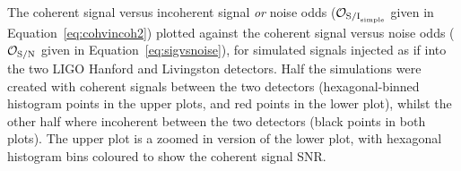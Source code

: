 \label{fig:oddsplot}
The coherent signal versus incoherent signal {\it or} noise odds ($\mathcal{O}_{{\rm S/I}_{\rm simple}}$ given
in Equation~\ref{eq:cohvincoh2}) plotted against the coherent signal versus noise odds ($\mathcal{O}_{\rm S/N}$ given
in Equation~\ref{eq:sigvsnoise}), for simulated signals injected as if into the two LIGO Hanford and Livingston
detectors. Half the simulations were created with coherent signals between the two detectors (hexagonal-binned histogram
points in the upper plots, and red points in the lower plot), whilst the other half where incoherent between the
two detectors (black points in both plots). The upper plot is a zoomed in version of the lower plot, with hexagonal
histogram bins coloured to show the coherent signal SNR.
